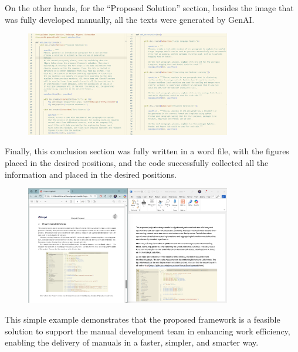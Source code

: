 \documentclass{article}%
\begin{document}
On the other hands, for the “Proposed Solution” section, besides the image that was fully developed manually, all the texts were generated by GenAI.

\begin{figure}[H]
\centering
\includegraphics[width=0.8\textwidth]{images/doc1/image3.png}
\end{figure}

Finally, this conclusion section was fully written in a word file, with the figures placed in the desired positions, and the code successfully collected all the information and placed in the desired positions.

\begin{figure}[H]
\centering
\includegraphics[width=0.8\textwidth]{images/doc1/image4.png}
\end{figure}

This simple example demonstrates that the proposed framework is a feasible solution to support the manual development team in enhancing work efficiency, enabling the delivery of manuals in a faster, simpler, and smarter way.

%
\end{document}
